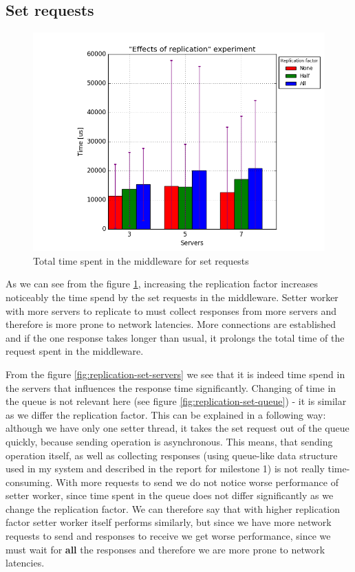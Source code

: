 \documentclass[11pt]{article}
\begin{document}
\subsection{Set requests}
\label{sec:replication-set}
\begin{figure}
\centering
	\includegraphics[width=0.7\linewidth]{plots/replication-set}

\caption{Total time spent in the middleware for set requests}
\label{fig:replication-set}
\end{figure}

As we can see from the figure \ref{fig:replication-set}, increasing the replication factor increases noticeably the time spend by the set requests in the middleware. Setter worker with more servers to replicate to must collect responses from more servers and therefore is more prone to network latencies. More connections are established and if the one response takes longer than usual, it prolongs the total time of the request spent in the middleware.

From the figure \ref{fig:replication-set-servers} we see that it is indeed time spend in the servers that influences the response time significantly. Changing of time in the queue is not relevant here (see figure \ref{fig:replication-set-queue}) - it is similar as we differ the replication factor. This can be explained in a following way: although we have only one setter thread, it takes the set request out of the queue quickly, because sending operation is asynchronous. This means, that sending operation itself, as well as collecting responses (using queue-like data structure used in my system and described in the report for milestone 1) is not really time-consuming. With more requests to send we do not notice worse performance of setter worker, since time spent in the queue does not differ significantly as we change the replication factor. We can therefore say that with higher replication factor setter worker itself performs similarly, but since we have more network requests to send and responses to receive we get worse performance, since we must wait for {\bf all} the responses and therefore we are more prone to network latencies.
\end{document}
